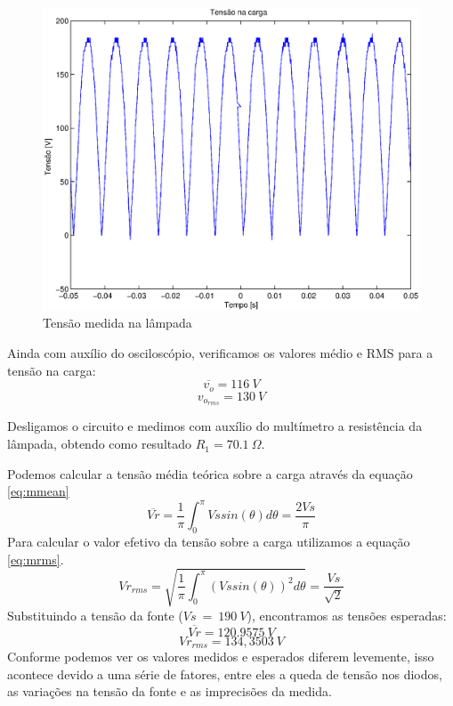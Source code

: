 \documentclass{report}
\begin{document}
\begin{figure}[H]
	\centering
	\includegraphics[width=\linewidth]{dados/monofasico/mono_r}
	\caption{Tensão medida na lâmpada}
	\label{fig:mono_r}
\end{figure}

Ainda com auxílio do osciloscópio, verificamos os valores médio e RMS para a tensão na carga:
\begin{equation}
\overline{v_o} = 116\ V
\end{equation}
\begin{equation}
v_{o_{rms}} = 130\ V
\end{equation}

Desligamos o circuito e medimos com auxílio do multímetro a resistência da lâmpada, obtendo como resultado $R_1=70.1\ \Omega$.

Podemos calcular a tensão média teórica sobre a carga através da equação \ref{eq:mmean}
\begin{equation}
\overline{Vr} = \frac{1}{\pi} \int_{0}^{\pi}{Vs sin(\theta)d\theta} = \frac{2 Vs}{\pi}
\label{eq:mmean}
\end{equation}
Para calcular o valor efetivo da tensão sobre a carga utilizamos a equação \ref{eq:mrms}.
\begin{equation}
Vr_{rms} = \sqrt{\frac{1}{\pi} \int_{0}^{\pi}{(Vs sin(\theta))^2 d\theta}} = \frac{Vs}{\sqrt{2}}
\label{eq:mrms}
\end{equation}
Substituindo a tensão da fonte ($Vs\ =\ 190\ V$), encontramos as tensões esperadas:
\begin{equation}
\overline{Vr} = 120.9575\ V
\end{equation}
\begin{equation}
Vr_{rms} =  134,3503\ V
\end{equation}
Conforme podemos ver os valores medidos e esperados diferem levemente, isso acontece devido a uma série de fatores, entre eles a queda de tensão nos diodos, as variações na tensão da fonte e as imprecisões da medida.
\end{document}
